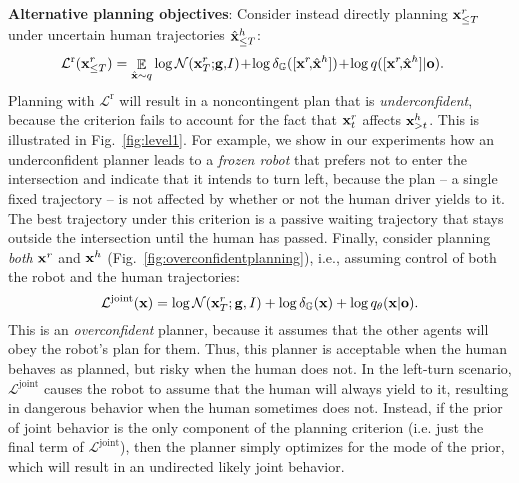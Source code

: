 \documentclass[conference]{IEEEtran}
\newcommand{\mypara}[1]{\vspace{1mm}\noindent\textbf{#1}:}
\begin{document}
\mypara{Alternative planning objectives} Consider instead directly planning $\mathbf{x}_{\leq T}^r$ under uncertain human trajectories $\hat{\mathbf{x}}_{\leq T}^h$: 
 {\footnotesize
 \begin{align*}
  \mathcal L^{\text{r}}(\bx_{\leq T}^r)&=\mathop{\mathbb E}_{\hat{\bx}\sim q}\log\mathcal N(\bx_T^r;\!\mathbf{g},\!I) 
    \! +\! \log \delta_{\mathbb G}([\bx^r\!,\!\hat{\bx}^h]) 
     \! +\! \log q([\bx^r\!,\!\hat{\bx}^h]|{\bo}).
 \end{align*}
}
Planning with ${\mathcal L^{\text{r}}}$ will result in a noncontingent plan that is \emph{underconfident}, because the criterion fails to account for the fact that $\mathbf{x}^r_t$ affects $\mathbf{x}^h_{>t}$. This is illustrated in Fig.~\ref{fig:level1}. For example, we show in our experiments how an underconfident planner leads to a \emph{frozen robot} that prefers not to enter the intersection and indicate that it intends to turn left, because the plan -- a single fixed trajectory -- is not affected by whether or not the human driver yields to it. The best trajectory under this criterion is a passive waiting trajectory that stays outside the intersection until the human has passed. Finally, consider planning \emph{both} $\mathbf{x}^r$ and $\mathbf{x}^h$ (Fig.~\ref{fig:overconfidentplanning}), i.e., assuming control of both the robot and the human trajectories: 
\begin{equation*}
    \mathcal L^{\text{joint}}(\mathbf{x}) =\log \mathcal N(\mathbf{x}_T^r; \mathbf{g}, I) + \log \delta_{\mathbb G}(\mathbf{x}) + \log q_\theta(\mathbf{x}|{\mathbf{o}}).
\end{equation*}
This is an \emph{overconfident} planner, because it assumes that the other agents will obey the robot's plan for them. Thus, this planner is acceptable when the human behaves as planned, but risky when the human does not. In the left-turn scenario, $\mathcal L^{\text{joint}}$ causes the robot to assume that the human will always yield to it, resulting in dangerous behavior when the human sometimes does not. Instead, if the prior of joint behavior is the only component of the planning criterion (i.e. just the final term of $\mathcal L^{\text{joint}}$), then the planner simply optimizes for the mode of the prior, which will result in an undirected likely joint behavior.

\vspace{-.25em}
\end{document}
